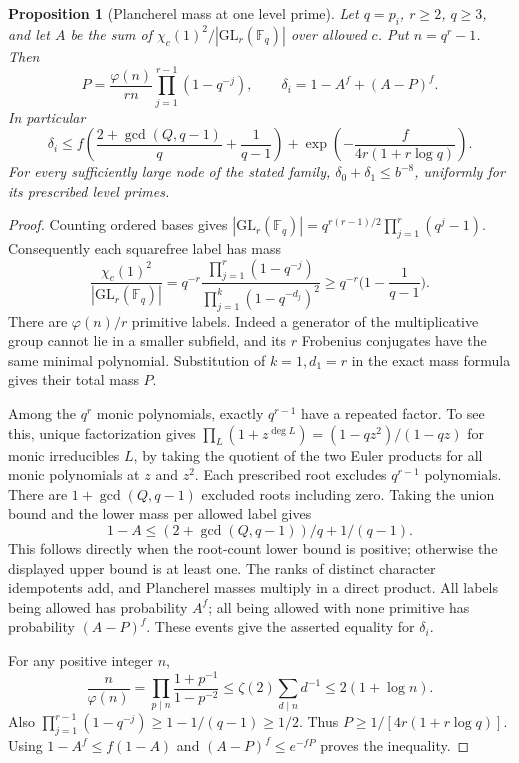 \documentclass[a4paper,11pt]{article}
\newtheorem{proposition}{Proposition}[section]
\theoremstyle{definition}
\theoremstyle{remark}
\numberwithin{equation}{section}
\begin{document}
\begin{proposition}[Plancherel mass at one level prime]
\leavevmode\label{prop:levelmass678}
Let \(q=p_i\), \(r\ge2\), \(q\ge3\), and let \(A\) be the
sum of \(\chi_c(1)^2/|\mathrm{GL}_r(\mathbb F_q)|\) over allowed
\(c\). Put \(n=q^r-1\). Then
\[
 P=\frac{\varphi(n)}{rn}\prod_{j=1}^{r-1}(1-q^{-j}),
 \qquad
 \delta_i=1-A^f+(A-P)^f .
\]
In particular
\[
 \delta_i\le f\left(\frac{2+\gcd(Q,q-1)}q+\frac1{q-1}\right)
                +\exp\!\left(-\frac{f}{4r(1+r\log q)}\right).
\]
For every sufficiently large node of the stated family,
\(\delta_0+\delta_1\le b^{-8}\), uniformly for its prescribed
level primes.
\end{proposition}
\begin{proof}
Counting ordered bases gives
\(|\mathrm{GL}_r(\mathbb F_q)|=q^{r(r-1)/2}\prod_{j=1}^r(q^j-1)\).
Consequently each squarefree label has mass
\[
 \frac{\chi_c(1)^2}{|\mathrm{GL}_r(\mathbb F_q)|}
   =q^{-r}\frac{\prod_{j=1}^r(1-q^{-j})}
                  {\prod_{j=1}^k(1-q^{-d_j})^2}
   \ge q^{-r}\Big(1-\frac1{q-1}\Big).
\]
There are \(\varphi(n)/r\) primitive labels. Indeed a generator
of the multiplicative group cannot lie in a smaller subfield,
and its \(r\) Frobenius conjugates have the same minimal
polynomial. Substitution of \(k=1,d_1=r\) in the exact mass
formula gives their total mass \(P\).

Among the \(q^r\) monic polynomials, exactly \(q^{r-1}\) have
a repeated factor. To see this, unique factorization gives
\(\prod_L(1+z^{\deg L})=(1-qz^2)/(1-qz)\) for monic irreducibles
\(L\), by taking the quotient of the two Euler products for all
monic polynomials at \(z\) and \(z^2\). Each prescribed root
excludes \(q^{r-1}\) polynomials. There are
\(1+\gcd(Q,q-1)\) excluded roots including zero. Taking the
union bound and the lower mass per allowed label gives
\[
        1-A\le (2+\gcd(Q,q-1))/q+1/(q-1).
\]
This follows directly when the root-count lower bound is
positive; otherwise the displayed upper bound is at least one.
The ranks of distinct character idempotents add, and
Plancherel masses multiply in a direct product. All labels
being allowed has probability \(A^f\); all being allowed with
none primitive has probability \((A-P)^f\). These events give
the asserted equality for \(\delta_i\).

For any positive integer \(n\),
\[
 \frac n{\varphi(n)}
   =\prod_{p\mid n}\frac{1+p^{-1}}{1-p^{-2}}
   \le \zeta(2)\sum_{d\mid n}d^{-1}\le 2(1+\log n).
\]
Also \(\prod_{j=1}^{r-1}(1-q^{-j})\ge 1-1/(q-1)\ge1/2\).
Thus \(P\ge1/[4r(1+r\log q)]\).
Using \(1-A^f\le f(1-A)\) and \((A-P)^f\le e^{-fP}\)
proves the inequality.


\end{proof}
\end{document}
